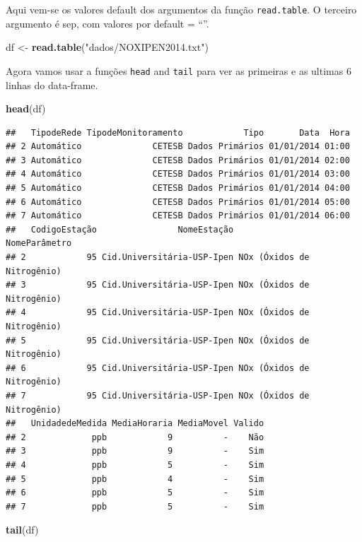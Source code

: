 \documentclass[]{book}
\newenvironment{Shaded}{\begin{snugshade}}{\end{snugshade}}
\newcommand{\KeywordTok}[1]{\textcolor[rgb]{0.13,0.29,0.53}{\textbf{#1}}}
\newcommand{\StringTok}[1]{\textcolor[rgb]{0.31,0.60,0.02}{#1}}
\newcommand{\NormalTok}[1]{#1}
\theoremstyle{definition}
\theoremstyle{definition}
\theoremstyle{definition}
\theoremstyle{remark}
\begin{document}
Aqui vem-se os valores default dos argumentos da função
\texttt{read.table}. O terceiro argumento é sep, com valores por default
= ``''.

\begin{Shaded}
\begin{Highlighting}[]
\NormalTok{df <-}\StringTok{ }\KeywordTok{read.table}\NormalTok{(}\StringTok{"dados/NOXIPEN2014.txt"}\NormalTok{)}
\end{Highlighting}
\end{Shaded}

Agora vamos usar a funções \texttt{head} and \texttt{tail} para ver as
primeiras e as ultimas 6 linhas do data-frame.

\begin{Shaded}
\begin{Highlighting}[]
\KeywordTok{head}\NormalTok{(df)}
\end{Highlighting}
\end{Shaded}

\begin{verbatim}
##   TipodeRede TipodeMonitoramento            Tipo       Data  Hora
## 2 Automático              CETESB Dados Primários 01/01/2014 01:00
## 3 Automático              CETESB Dados Primários 01/01/2014 02:00
## 4 Automático              CETESB Dados Primários 01/01/2014 03:00
## 5 Automático              CETESB Dados Primários 01/01/2014 04:00
## 6 Automático              CETESB Dados Primários 01/01/2014 05:00
## 7 Automático              CETESB Dados Primários 01/01/2014 06:00
##   CodigoEstação                NomeEstação              NomeParâmetro
## 2            95 Cid.Universitária-USP-Ipen NOx (Óxidos de Nitrogênio)
## 3            95 Cid.Universitária-USP-Ipen NOx (Óxidos de Nitrogênio)
## 4            95 Cid.Universitária-USP-Ipen NOx (Óxidos de Nitrogênio)
## 5            95 Cid.Universitária-USP-Ipen NOx (Óxidos de Nitrogênio)
## 6            95 Cid.Universitária-USP-Ipen NOx (Óxidos de Nitrogênio)
## 7            95 Cid.Universitária-USP-Ipen NOx (Óxidos de Nitrogênio)
##   UnidadedeMedida MediaHoraria MediaMovel Valido
## 2             ppb            9          -    Não
## 3             ppb            9          -    Sim
## 4             ppb            5          -    Sim
## 5             ppb            4          -    Sim
## 6             ppb            5          -    Sim
## 7             ppb            5          -    Sim
\end{verbatim}

\begin{Shaded}
\begin{Highlighting}[]
\KeywordTok{tail}\NormalTok{(df)}
\end{Highlighting}
\end{Shaded}
\end{document}
